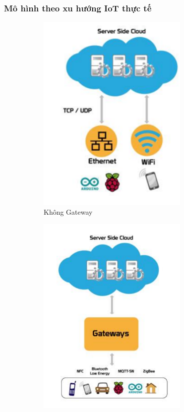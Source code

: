 \subsubsection*{Mô hình theo xu hướng IoT thực tế}
\begin{figure}[H]
\centering  
  \begin{subfigure}[b]{0.5\textwidth}
    \includegraphics[width=0.8\textwidth]{pic5}
    \caption[Không Gateway]{Không Gateway}
    \label{fig:pic5}
  \end{subfigure}\hfill
  \begin{subfigure}[b]{0.5\textwidth}
    \includegraphics[width=0.8\textwidth]{pic6}

\end{subfigure}
\end{figure}
